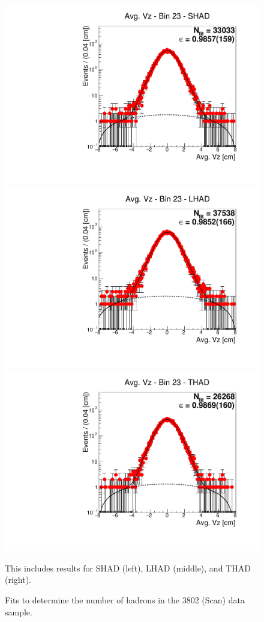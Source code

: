 \begin{figure}[H]
\centering
\includegraphics[scale=0.25]{figures/plots/nonDDbar_fit_results/scan/fit_scan_23_data_SHAD.pdf}
\hspace{-0.5cm}
\includegraphics[scale=0.25]{figures/plots/nonDDbar_fit_results/scan/fit_scan_23_data_LHAD.pdf}
\hspace{-0.5cm}
\includegraphics[scale=0.25]{figures/plots/nonDDbar_fit_results/scan/fit_scan_23_data_THAD.pdf}
\caption{Fits to determine the number of hadrons in the 3802 (Scan) data sample.}
{This includes results for SHAD (left), LHAD (middle), and THAD (right).}
\label{fig:hadron_fits_scan_23}
\end{figure}

